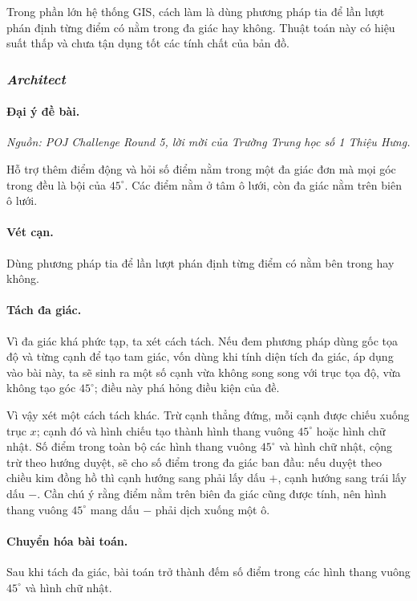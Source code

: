 \documentclass[11pt]{article}
\begin{document}
Trong phần lớn hệ thống GIS, cách làm là dùng phương pháp tia để lần lượt phán
định từng điểm có nằm trong đa giác hay không. Thuật toán này có hiệu suất thấp
và chưa tận dụng tốt các tính chất của bản đồ.

\subsubsection{\emph{Architect}}

\paragraph{Đại ý đề bài.}
\emph{Nguồn: POJ Challenge Round 5, lời mời của Trường Trung học số 1 Thiệu
Hưng.}

Hỗ trợ thêm điểm động và hỏi số điểm nằm trong một đa giác đơn mà mọi góc trong
đều là bội của \(45^\circ\). Các điểm nằm ở tâm ô lưới, còn đa giác nằm trên
biên ô lưới.

\paragraph{Vét cạn.}
Dùng phương pháp tia để lần lượt phán định từng điểm có nằm bên trong hay
không.

\paragraph{Tách đa giác.}
Vì đa giác khá phức tạp, ta xét cách tách. Nếu đem phương pháp dùng gốc tọa độ
và từng cạnh để tạo tam giác, vốn dùng khi tính diện tích đa giác, áp dụng vào
bài này, ta sẽ sinh ra một số cạnh vừa không song song với trục tọa độ, vừa
không tạo góc \(45^\circ\); điều này phá hỏng điều kiện của đề.

Vì vậy xét một cách tách khác. Trừ cạnh thẳng đứng, mỗi cạnh được chiếu xuống
trục \(x\); cạnh đó và hình chiếu tạo thành hình thang vuông \(45^\circ\) hoặc
hình chữ nhật. Số điểm trong toàn bộ các hình thang vuông \(45^\circ\) và hình
chữ nhật, cộng trừ theo hướng duyệt, sẽ cho số điểm trong đa giác ban đầu: nếu
duyệt theo chiều kim đồng hồ thì cạnh hướng sang phải lấy dấu \(+\), cạnh hướng
sang trái lấy dấu \(-\). Cần chú ý rằng điểm nằm trên biên đa giác cũng được
tính, nên hình thang vuông \(45^\circ\) mang dấu \(-\) phải dịch xuống một ô.

\paragraph{Chuyển hóa bài toán.}
Sau khi tách đa giác, bài toán trở thành đếm số điểm trong các hình thang vuông
\(45^\circ\) và hình chữ nhật.
\end{document}
